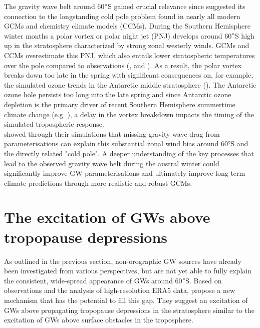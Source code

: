 The gravity wave belt around 60$\degree$S gained crucial relevance since \textcite{mclandress_is_2012} suggested its connection to the longstanding cold pole problem found in nearly all modern GCMs and chemistry climate models (CCMs). During the Southern Hemisphere winter months a polar vortex or polar night jet (PNJ) develops around 60$\degree$S high up in the stratosphere characterized by strong zonal westerly winds. GCMs and CCMs overestimate this PNJ, which also entails lower stratospheric temperatures over the pole compared to observations (\cite{butchart_et_al_multimodel_2011}, \cite{geller_comparison_2013} and \cite{eyring_sparc_2010}). As a result, the polar vortex breaks down too late in the spring with significant consequences on, for example, the simulated ozone trends in the Antarctic middle stratosphere (\cite{stolarski_ozone_2006}). The Antarctic ozone hole persists too long into the late spring and since Antarctic ozone depletion is the primary driver of recent Southern Hemisphere summertime climate change (e.g. \cite{arblaster_contributions_2006}), a delay in the vortex breakdown impacts the timing of the simulated tropospheric response. \\
\textcite{mclandress_is_2012} showed through their simulations that missing gravity wave drag from parameterisations can explain this substantial zonal wind bias around 60°S and the directly related "cold pole". A deeper understanding of the key processes that lead to the observed gravity wave belt during the austral winter could significantly improve GW parameterisations and ultimately improve long-term climate predictions through more realistic and robust GCMs. 




\section{The excitation of GWs above tropopause depressions}
\label{sec:excitation}
As outlined in the previous section, non-orographic GW sources have already been investigated from various perspectives, but are not yet able to fully explain the consistent, wide-spread appearance of GWs around 60$\degree$S. Based on observations and the analysis of high-resolution ERA5 data, \textcite{dornbrack_stratospheric_2022} propose a new mechanism that has the potential to fill this gap. They suggest an excitation of GWs above propagating tropopause depressions in the stratosphere similar to the excitation of GWs above surface obstacles in the troposphere.

